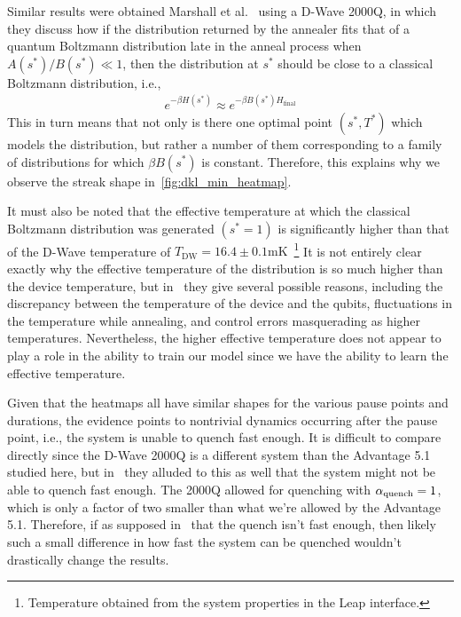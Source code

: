 Similar results were obtained Marshall et al.~\cite{marshall_2019} using a D-Wave 2000Q, in which they discuss how if the distribution returned by the annealer fits that of a quantum Boltzmann distribution late in the anneal process when \( A(s^*) / B(s^*) \ll 1 \), then the distribution at \( s^* \) should be close to a classical Boltzmann distribution, i.e.,
\begin{align}
    e^{-\beta H(s^*)} \approx e^{-\beta B(s^*) H_\text{final}}
\end{align}
This in turn means that not only is there one optimal point \( (s^*, T^*) \) which models the distribution, but rather a number of them corresponding to a family of distributions for which \( \beta B(s^*) \) is constant.
Therefore, this explains why we observe the streak shape in~\cref{fig:dkl_min_heatmap}.

It must also be noted that the effective temperature at which the classical Boltzmann distribution was generated \( (s^* = 1) \) is significantly higher than that of the D-Wave temperature of \( T_\text{DW} = 16.4 \pm 0.1 \si{\milli\kelvin} \)~\cite{dwave_leap}\footnote{Temperature obtained from the system properties in the Leap interface.}
It is not entirely clear exactly why the effective temperature of the distribution is so much higher than the device temperature, but in~\cite{marshall_2019} they give several possible reasons, including the discrepancy between the temperature of the device and the qubits, fluctuations in the temperature while annealing, and control errors masquerading as higher temperatures.
Nevertheless, the higher effective temperature does not appear to play a role in the ability to train our model since we have the ability to learn the effective temperature.

Given that the heatmaps all have similar shapes for the various pause points and durations, the evidence points to nontrivial dynamics occurring after the pause point, i.e., the system is unable to quench fast enough.
It is difficult to compare directly since the D-Wave 2000Q is a different system than the Advantage 5.1 studied here, but in~\cite{marshall_2019} they alluded to this as well that the system might not be able to quench fast enough.
The 2000Q allowed for quenching with \( \alpha_{\text{quench}} = 1 \), which is only a factor of two smaller than what we're allowed by the Advantage 5.1.
Therefore, if as supposed in~\cite{marshall_2019} that the quench isn't fast enough, then likely such a small difference in how fast the system can be quenched wouldn't drastically change the results.

